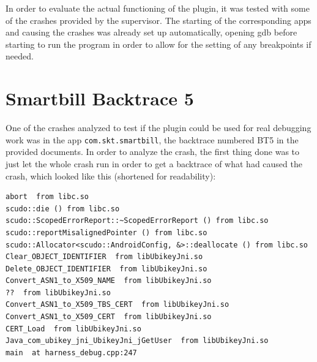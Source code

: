 \documentclass[a4paper,11pt,oneside]{report}
\begin{document}
In order to evaluate the actual functioning of the plugin, it was tested with
some of the crashes provided by the supervisor. The starting of the corresponding
apps and causing the crashes was already set up automatically, opening gdb
before starting to run the program in order to allow for the setting of any
breakpoints if needed.

\section{Smartbill Backtrace 5}

One of the crashes analyzed to test if the plugin could be used for real
debugging work was in the app \verb|com.skt.smartbill|, the backtrace numbered
BT5 in the provided documents. In order to analyze the crash, the first thing
done was to just let the whole crash run in order to get a backtrace of what
had caused the crash, which looked like this (shortened for readability):

\begin{verbatim}
abort  from libc.so
scudo::die () from libc.so
scudo::ScopedErrorReport::~ScopedErrorReport () from libc.so
scudo::reportMisalignedPointer () from libc.so
scudo::Allocator<scudo::AndroidConfig, &>::deallocate () from libc.so
Clear_OBJECT_IDENTIFIER  from libUbikeyJni.so
Delete_OBJECT_IDENTIFIER  from libUbikeyJni.so
Convert_ASN1_to_X509_NAME  from libUbikeyJni.so
??  from libUbikeyJni.so
Convert_ASN1_to_X509_TBS_CERT  from libUbikeyJni.so
Convert_ASN1_to_X509_CERT  from libUbikeyJni.so
CERT_Load  from libUbikeyJni.so
Java_com_ubikey_jni_UbikeyJni_jGetUser  from libUbikeyJni.so
main  at harness_debug.cpp:247
\end{verbatim}
\end{document}
